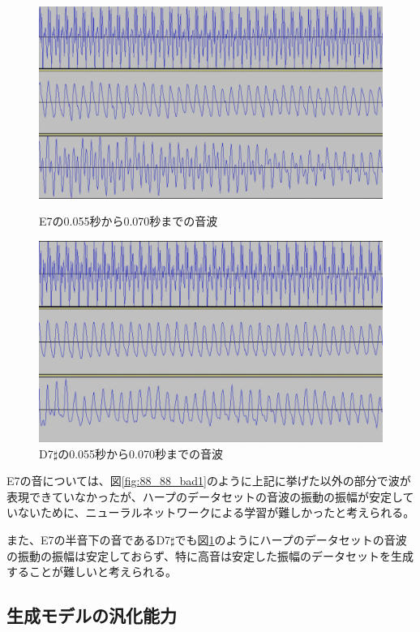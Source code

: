 \begin{description}
\begin{figure}[t]
\begin{center}
\begin{minipage}{0.48\hsize}
\begin{center}
\includegraphics[width=0.9\hsize]{figure/88_88_det/e7_0550_0700.png}
\caption{E7の0.055秒から0.070秒までの音波}
\label{fig:88_88_bad1}
\end{center}
\end{minipage}
\begin{minipage}{0.48\hsize}
\begin{center}
\includegraphics[width=0.9\hsize]{figure/88_88_det/d7s_0550_0700.png}
\caption{D7$\sharp$の0.055秒から0.070秒までの音波}
\label{fig:88_88_bad2}
\end{center}
\end{minipage}
\end{center}
\end{figure}

E7の音については、図\ref{fig:88_88_bad1}のように上記に挙げた以外の部分で波が表現できていなかったが、ハープのデータセットの音波の振動の振幅が安定していないために、ニューラルネットワークによる学習が難しかったと考えられる。

また、E7の半音下の音であるD7$\sharp$でも図\ref{fig:88_88_bad2}のようにハープのデータセットの音波の振動の振幅は安定しておらず、特に高音は安定した振幅のデータセットを生成することが難しいと考えられる。

\end{description}



\subsection{生成モデルの汎化能力}




